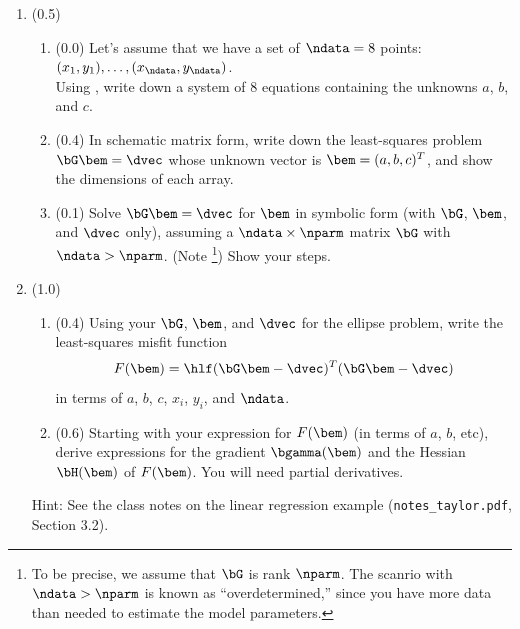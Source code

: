 \documentclass[11pt,titlepage,fleqn]{article}
\begin{document}
\begin{enumerate}
\item (0.5) 

\begin{enumerate}
\item (0.0) Let's assume that we have a set of $\ndata=8$ points: $(x_1,y_1), \ldots, (x_{\ndata},y_{\ndata})$. \\
Using , write down a system of 8 equations containing the unknowns $a$, $b$, and $c$.

\item  (0.4) In schematic matrix form, write down the least-squares problem $\bG\bem=\dvec$ whose unknown vector is $\bem = (a,b,c)^T$, and show the dimensions of each array.

\item (0.1) Solve $\bG\bem=\dvec$ for $\bem$ in symbolic form (\ie with $\bG$, $\bem$, and $\dvec$ only), assuming a $\ndata \times \nparm$ matrix $\bG$ with $\ndata > \nparm$. (Note \footnote{To be precise, we assume that $\bG$ is rank $\nparm$. The scanrio with $\ndata > \nparm$ is known as ``overdetermined,'' since you have more data than needed to estimate the model parameters.}) Show your steps.
\end{enumerate}


\item (1.0) 
\begin{enumerate}
\item (0.4) Using your $\bG$, $\bem$, and $\dvec$ for the ellipse problem, write the least-squares misfit function
%
\begin{equation}
F(\bem) = \hlf (\bG\bem - \dvec)^T(\bG\bem - \dvec)
\end{equation}
%
in terms of $a$, $b$, $c$, $x_i$, $y_i$, and $\ndata$.

\item (0.6) Starting with your expression for $F(\bem)$ (in terms of $a$, $b$, etc), derive expressions for the gradient $\bgamma(\bem)$ and the Hessian $\bH(\bem)$ of $F(\bem)$. You will need partial derivatives.


\end{enumerate}

Hint: See the class notes on the linear regression example (\verb+notes_taylor.pdf+, Section 3.2).


\end{enumerate}
\end{document}
